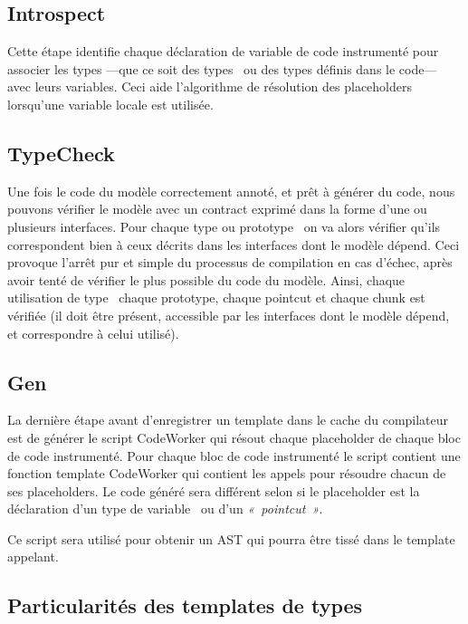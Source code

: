 \documentclass[french]{rtxreport}
\begin{document}
\subsection{Introspect}

Cette étape identifie chaque déclaration de variable de code instrumenté pour
associer les types ---que ce soit des types \rtx\ ou des types
définis dans le code--- avec leurs variables. Ceci aide l'algorithme de
résolution des placeholders lorsqu'une variable locale est utilisée. %

\subsection{TypeCheck}

Une fois le code du modèle correctement annoté, et prêt à générer du code,
nous pouvons vérifier le modèle avec un contract exprimé dans la forme d'une
ou plusieurs interfaces. Pour chaque type ou prototype \rtx\, on va alors
vérifier qu'ils correspondent bien à ceux décrits dans les interfaces dont
le modèle dépend. Ceci provoque l'arrêt pur et simple du processus de
compilation en cas d'échec, après avoir tenté de vérifier le plus possible
du code du modèle. Ainsi, chaque utilisation de type \rtx\, chaque prototype,
chaque pointcut et chaque chunk est vérifiée (il doit être présent, accessible
par les interfaces dont le modèle dépend, et correspondre à celui utilisé).

\subsection{Gen}

La dernière étape avant d'enregistrer un template dans le cache du compilateur
est de générer le script CodeWorker qui résout chaque placeholder de chaque bloc
de code instrumenté. Pour chaque bloc de code instrumenté le script contient une
fonction template CodeWorker qui contient les appels pour résoudre chacun de ses
placeholders. Le code généré sera différent selon si le placeholder est la
déclaration d'un type de variable \rtx\ ou d'un \emph{«~pointcut~»}.

Ce script sera utilisé pour obtenir un AST qui pourra être tissé dans le
template appelant.

\subsection{Particularités des templates de types}
\end{document}
